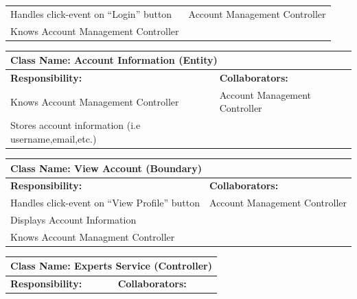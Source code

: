 \documentclass[]{article}
\begin{document}
\begin{itemize}
\begin{table}[H]
\begin{tabular}{|p{6cm}|p{6cm}|}
            Handles click-event on “Login” button &  Account Management Controller \\
                Knows Account Management Controller & \\
            \hline
            \end{tabular}
        \end{table}
        \begin{table}[H]
            \centering
            \begin{tabular}{|p{6cm}|p{6cm}|}
            \hline 
             \multicolumn{2}{|l|}{\textbf{Class Name: Account Information (Entity)}} \\
            \hline
            \textbf{Responsibility:} & \textbf{Collaborators:} \\
            \hline
            Knows Account Management Controller & Account Management Controller\\ 
                 Stores account information (i.e username,email,etc.) & \\
            \hline
            \end{tabular}
        \end{table}
        \begin{table}[H]
            \centering
            \begin{tabular}{|p{6cm}|p{6cm}|}
            \hline 
             \multicolumn{2}{|l|}{\textbf{Class Name: View Account (Boundary)}} \\
            \hline
            \textbf{Responsibility:} & \textbf{Collaborators:} \\
            \hline
            Handles click-event on “View Profile” button & Account Management Controller\\
            Displays Account Information &  \\
                Knows Account Managment Controller &  \\
            \hline
            \end{tabular}
        \end{table}
        \begin{table}[H]
            \centering
            \begin{tabular}{|p{6cm}|p{6cm}|}
            \hline 
             \multicolumn{2}{|l|}{\textbf{Class Name: Experts Service (Controller)}} \\
            \hline
            \textbf{Responsibility:} & \textbf{Collaborators:} \\
            \hline

\end{tabular}
\end{table}
\end{itemize}
\end{document}
